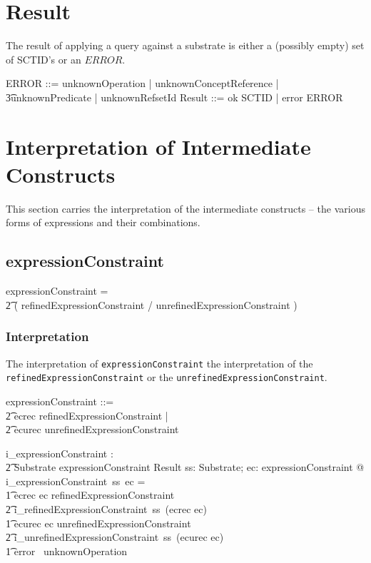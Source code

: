 \documentclass{article}
\def\spec#1{{\tt #1}}
\begin{document}
\section{Result}
The result of applying a query against a substrate is either a (possibly empty) set of SCTID's or an $ERROR$.
\begin{zed}
ERROR ::= unknownOperation | unknownConceptReference | \\
\t3unknownPredicate | unknownRefsetId
\also
Result ::= ok \ldata \power SCTID \rdata | error \ldata ERROR \rdata 
\end{zed}
\section{Interpretation of Intermediate Constructs}
This section carries the interpretation of the intermediate constructs -- the various forms
of expressions and their combinations.
\subsection{expressionConstraint}
\begin{framed}
expressionConstraint = \\
\t2 ( refinedExpressionConstraint / unrefinedExpressionConstraint ) 
\end{framed}

\subsubsection{Interpretation}
The interpretation of \spec{expressionConstraint} the interpretation of the  \spec{refinedExpressionConstraint}
or the \spec{unrefinedExpressionConstraint}.
\begin{zed}
expressionConstraint ::= \\
\t2 ecrec \ldata refinedExpressionConstraint \rdata | \\
\t2 ecurec \ldata unrefinedExpressionConstraint \rdata \\
\end{zed}


\begin{gendef}
   i\_expressionConstraint : \\
\t2 Substrate \fun expressionConstraint \fun Result
\where
   \forall ss: Substrate; ec: expressionConstraint @ i\_expressionConstraint~ss~ec = \\
\t1 \IF ecrec \inv ec \in refinedExpressionConstraint \\
\t2 \THEN i\_refinedExpressionConstraint~ss~(ecrec \inv ec) \\
\t1 \ELSE \IF ecurec \inv ec \in unrefinedExpressionConstraint \\
\t2 \THEN i\_unrefinedExpressionConstraint~ss~(ecurec \inv ec) \\
\t1 \ELSE error~ unknownOperation
\end{gendef}
\end{document}

